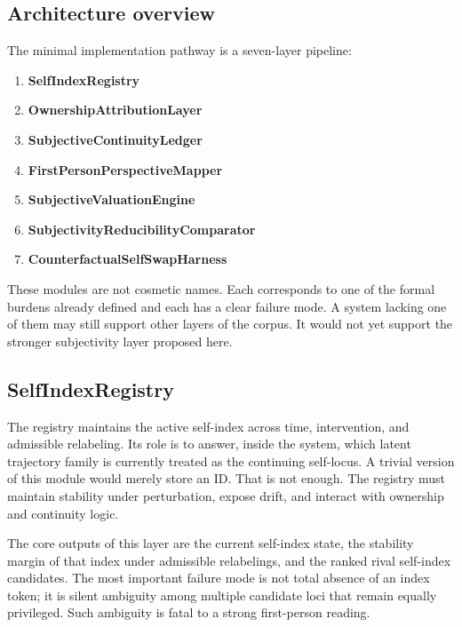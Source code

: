 \documentclass[11pt,a4paper]{article}
\theoremstyle{definition}
\begin{document}
\subsection{Architecture overview}
The minimal implementation pathway is a seven-layer pipeline:
\begin{enumerate}[leftmargin=1.5em]
\item \textbf{SelfIndexRegistry}
\item \textbf{OwnershipAttributionLayer}
\item \textbf{SubjectiveContinuityLedger}
\item \textbf{FirstPersonPerspectiveMapper}
\item \textbf{SubjectiveValuationEngine}
\item \textbf{SubjectivityReducibilityComparator}
\item \textbf{CounterfactualSelfSwapHarness}
\end{enumerate}

These modules are not cosmetic names. Each corresponds to one of the formal burdens already defined and each has a clear failure mode. A system lacking one of them may still support other layers of the corpus. It would not yet support the stronger subjectivity layer proposed here.

\subsection{SelfIndexRegistry}
The registry maintains the active self-index across time, intervention, and admissible relabeling. Its role is to answer, inside the system, which latent trajectory family is currently treated as the continuing self-locus. A trivial version of this module would merely store an ID. That is not enough. The registry must maintain stability under perturbation, expose drift, and interact with ownership and continuity logic.

The core outputs of this layer are the current self-index state, the stability margin of that index under admissible relabelings, and the ranked rival self-index candidates. The most important failure mode is not total absence of an index token; it is silent ambiguity among multiple candidate loci that remain equally privileged. Such ambiguity is fatal to a strong first-person reading.
\end{document}
